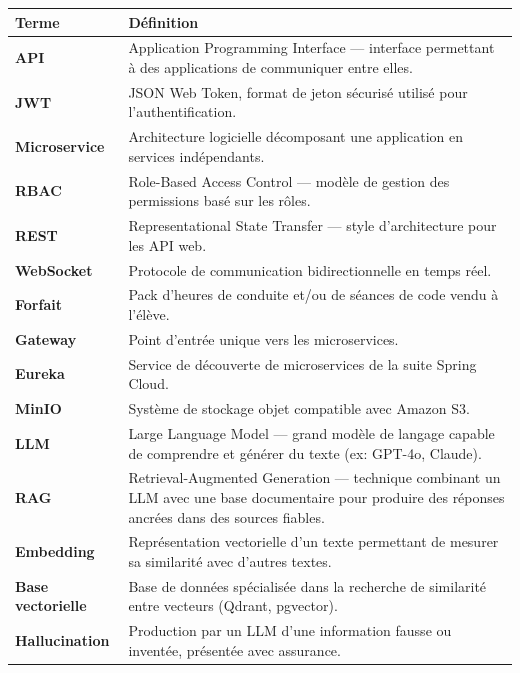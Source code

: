 \documentclass[12pt,a4paper]{article}
\begin{document}
\renewcommand{\arraystretch}{1.3}
\begin{longtable}{>{\bfseries\color{primary}}p{3.5cm} p{10cm}}
    \toprule
    \textbf{\color{primary}Terme} & \textbf{\color{primary}Définition} \\
    \midrule
    \endhead

    API & Application Programming Interface --- interface permettant à des applications de communiquer entre elles. \\
    \rowcolor{lightgray}
    JWT & JSON Web Token, format de jeton sécurisé utilisé pour l'authentification. \\
    Microservice & Architecture logicielle décomposant une application en services indépendants. \\
    \rowcolor{lightgray}
    RBAC & Role-Based Access Control --- modèle de gestion des permissions basé sur les rôles. \\
    REST & Representational State Transfer --- style d'architecture pour les API web. \\
    \rowcolor{lightgray}
    WebSocket & Protocole de communication bidirectionnelle en temps réel. \\
    Forfait & Pack d'heures de conduite et/ou de séances de code vendu à l'élève. \\
    \rowcolor{lightgray}
    Gateway & Point d'entrée unique vers les microservices. \\
    Eureka & Service de découverte de microservices de la suite Spring Cloud. \\
    \rowcolor{lightgray}
    MinIO & Système de stockage objet compatible avec Amazon S3. \\
    LLM & Large Language Model --- grand modèle de langage capable de comprendre et générer du texte (ex: GPT-4o, Claude). \\
    \rowcolor{lightgray}
    RAG & Retrieval-Augmented Generation --- technique combinant un LLM avec une base documentaire pour produire des réponses ancrées dans des sources fiables. \\
    Embedding & Représentation vectorielle d'un texte permettant de mesurer sa similarité avec d'autres textes. \\
    \rowcolor{lightgray}
    Base vectorielle & Base de données spécialisée dans la recherche de similarité entre vecteurs (Qdrant, pgvector). \\
    Hallucination & Production par un LLM d'une information fausse ou inventée, présentée avec assurance. \\

\end{longtable}
\end{document}
